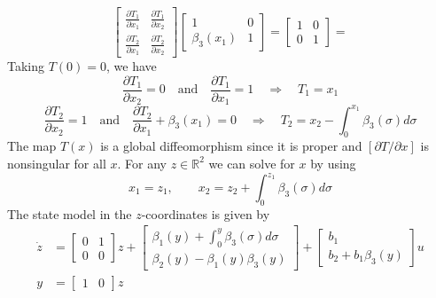 \documentclass[12pt,a4paper,oneside]{book}
\begin{document}
\begin{onehalfspace}
\begin{example}
\begin{equation*}
		\begin{bmatrix}
			\frac{\partial T_1}{\partial x_1} & \frac{\partial T_1}{\partial x_2} \\[6pt] \frac{\partial T_2}{\partial x_1} & \frac{\partial T_2}{\partial x_2}
		\end{bmatrix}
		\begin{bmatrix}
			1 & 0 \\[6pt] \beta_3(x_1) & 1
		\end{bmatrix}=
		\begin{bmatrix}
			1 & 0 \\[6pt] 0 & 1
		\end{bmatrix}=	
	\end{equation*}
	Taking $T(0)=0$, we have 
	\begin{equation*}
		\frac{\partial T_1}{\partial x_2}=0\quad\text{and}\quad\frac{\partial T_1}{\partial x_1}=1\quad\Rightarrow\quad T_1=x_1
	\end{equation*}
	\begin{equation*}
		\frac{\partial T_2}{\partial x_2}=1\quad\text{and}\quad\frac{\partial T_2}{\partial x_1}+\beta_3(x_1)=0\quad\Rightarrow\quad T_2=x_2-\int_{0}^{x_1}\beta_3(\sigma)d\sigma
	\end{equation*}
	The map $T(x)$ is a global diffeomorphism since it is proper and $[\partial T/\partial x]$ is nonsingular for all $x$. For any $z\in\mathbb{R}^2$ we can solve for $x$ by using
	\begin{equation*}
		x_1=z_1,\qquad x_2=z_2+\int_{0}^{z_1}\beta_3(\sigma)d\sigma
	\end{equation*}
	The state model in the $z$-coordinates is given by
	\begin{equation*}
		\begin{aligned}
			\dot{z} &= \begin{bmatrix} 0&1\\[6pt]0&0 \end{bmatrix}z+\begin{bmatrix} \beta_1(y)+\int_{0}^{y}\beta_3(\sigma)d\sigma \\[6pt] \beta_2(y)-\beta_1(y)\beta_3(y)\end{bmatrix}+\begin{bmatrix} b_1 \\[6pt] b_2+b_1\beta_3(y) \end{bmatrix}u \\[8pt]
			y &= \begin{bmatrix} 1 & 0 \end{bmatrix}z
		\end{aligned}
	\end{equation*}
	

\end{example}
\end{onehalfspace}
\end{document}
